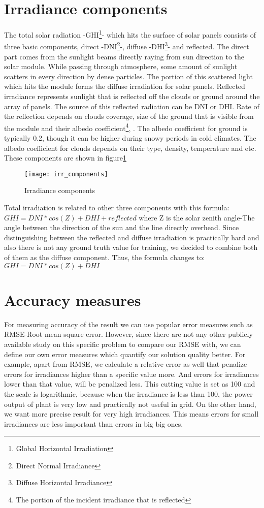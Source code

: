 \section{Irradiance components}
The total solar radiation -GHI\footnote{Global Horizontal Irradiation}- which hits the surface of solar panels consists of three basic components, direct -DNI\footnote{Direct Normal Irradiance}-, diffuse -DHI\footnote{Diffuse Horizontal Irradiance}- and reflected. The direct part comes from the sunlight beams directly raying from sun direction to the solar module. While passing through atmosphere, some amount of sunlight scatters in every direction by dense particles. The portion of this scattered light which hits the module forms the diffuse irradiation for solar panels. 
Reflected irradiance represents sunlight that is reflected off the clouds or ground around the array of panels. The source of this reflected radiation can be DNI or DHI. Rate of the reflection depends on clouds coverage, size of the ground that is visible from the module and their albedo coefficient\footnote{The portion of the incident irradiance that is reflected}, . The albedo coefficient for ground is typically 0.2, though it can be higher during snowy periods in cold climates. The albedo coefficient for clouds depends on their type, density, temperature and etc. These components are shown in figure\ref{fig:irr_comps}

\begin{figure}[h]
\caption{Irradiance components}
\label{fig:irr_comps}
\texttt{[image: irr\_components]}
\centering
\end{figure} 

Total irradiation is related to other three components with this formula:
$GHI = DNI * cos (Z) + DHI + reflected$
where Z is the solar zenith angle-The angle between the direction of the sun and the line directly overhead.
Since distinguishing between the reflected and diffuse irradiation is practically hard and also there is not any ground truth value for training, we decided to combine both of them as the diffuse component. Thus, the formula changes to:
$GHI = DNI * cos (Z) + DHI$

\section{Accuracy measures}
For measuring accuracy of the result we can use popular error measures such as RMSE-Root mean square error. However, since there are not any other publicly available study on this specific problem to compare our RMSE with, we can define our own error measures which quantify our solution quality better. For example, apart from RMSE, we calculate a relative error as well that penalize errors for irradiances higher than a specific value more. And errors for irradiances lower than that value, will be penalized less. This cutting value is set as 100 and the scale is logarithmic, because when the irradiance is less than 100, the power output of plant is very low and practically not useful in grid. On the other hand, we want more precise result for very high irradiances. This means errors for small irradiances are less important than errors in big big ones.



